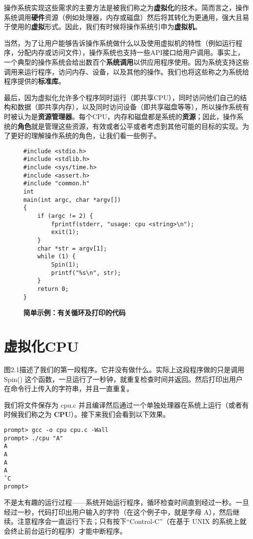 操作系统实现这些需求的主要方法是被我们称之为\textbf{虚拟化}的技术。简而言之，操作系统调用\textbf{硬件}资源（例如处理器，内存或磁盘）然后将其转化为更通用，强大且易于使用的\textbf{虚拟}形式。因此，我们有时候将操作系统引申为\textbf{虚拟机}。

当然，为了让用户能够告诉操作系统做什么以及使用虚拟机的特性（例如运行程序，分配内存或访问文件），操作系统也支持一些API接口给用户调用。事实上，一个典型的操作系统会给出数百个\textbf{系统调用}以供应用程序使用。因为系统支持这些调用来运行程序，访问内存、设备，以及其他的操作。我们也将这些称之为系统给程序提供的\textbf{标准库}。

最后，因为虚拟化允许多个程序同时运行（即共享CPU），同时访问他们自己的结构和数据（即共享内存），以及同时访问设备（即共享磁盘等等），所以操作系统有时被认为是\textbf{资源管理器}。每个CPU，内存和磁盘都是系统的\textbf{资源}；因此，操作系统的\textbf{角色}就是管理这些资源，有效或者公平或者考虑到其他可能的目标的实现。为了更好的理解操作系统的角色，让我们看一些例子。

\newpage

\begin{figure}[ht]
\begin{lstlisting}  
#include <stdio.h> 
#include <stdlib.h> 
#include <sys/time.h> 
#include <assert.h> 
#include "common.h"
int
main(int argc, char *argv[])
{
    if (argc != 2) {
        fprintf(stderr, "usage: cpu <string>\n");
        exit(1);
    }
    char *str = argv[1];
    while (1) {
        Spin(1);
        printf("%s\n", str);
    }
    return 0;
}
\end{lstlisting}
\caption{\textbf{简单示例：有关循环及打印的代码}}
\end{figure}

\section{虚拟化CPU}
    
图2.1描述了我们的第一段程序。它并没有做什么。实际上这段程序做的只是调用 Spin() 这个函数，一旦运行了一秒钟，就重复检查时间并返回。然后打印出用户在命令行上传入的字符串，并且一直重复。

我们将文件保存为 cpu.c 并且编译然后通过一个单独处理器在系统上运行（或者有时候我们称之为 \textbf{CPU}）。接下来我们会看到以下效果。

\begin{verbatim}
prompt> gcc -o cpu cpu.c -Wall
prompt> ./cpu "A"
A
A
A
A
ˆC
prompt>
\end{verbatim}

不是太有趣的运行过程——系统开始运行程序，循环检查时间直到经过一秒。一旦经过一秒，代码打印出用户输入的字符（在这个例子中，就是字母 A），然后继续。注意程序会一直运行下去；只有按下“Control-C”（在基于 UNIX 的系统上就会终止前台运行的程序）才能中断程序。

